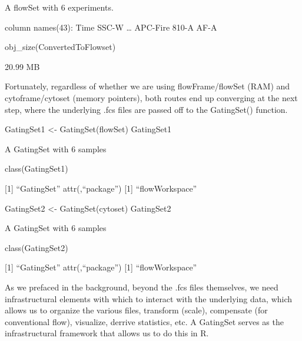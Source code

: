 \documentclass[
  letterpaper,
  DIV=11,
  numbers=noendperiod]{scrartcl}
\newenvironment{Shaded}{\begin{snugshade}}{\end{snugshade}}
\newcommand{\FunctionTok}[1]{\textcolor[rgb]{0.28,0.35,0.67}{#1}}
\newcommand{\NormalTok}[1]{\textcolor[rgb]{0.00,0.23,0.31}{#1}}
\newcommand{\OtherTok}[1]{\textcolor[rgb]{0.00,0.23,0.31}{#1}}
\begin{document}
A flowSet with 6 experiments.

column names(43): Time SSC-W \ldots{} APC-Fire 810-A AF-A

\begin{Shaded}
\begin{Highlighting}[]
\FunctionTok{obj\_size}\NormalTok{(ConvertedToFlowset)}
\end{Highlighting}
\end{Shaded}

20.99 MB

Fortunately, regardless of whether we are using flowFrame/flowSet (RAM)
and cytoframe/cytoset (memory pointers), both routes end up converging
at the next step, where the underlying .fcs files are passed off to the
GatingSet() function.

\begin{Shaded}
\begin{Highlighting}[]
\NormalTok{GatingSet1 }\OtherTok{\textless{}{-}} \FunctionTok{GatingSet}\NormalTok{(flowSet)}
\NormalTok{GatingSet1 }
\end{Highlighting}
\end{Shaded}

A GatingSet with 6 samples

\begin{Shaded}
\begin{Highlighting}[]
\FunctionTok{class}\NormalTok{(GatingSet1)}
\end{Highlighting}
\end{Shaded}

{[}1{]} ``GatingSet'' attr(,``package'') {[}1{]} ``flowWorkspace''

\begin{Shaded}
\begin{Highlighting}[]
\NormalTok{GatingSet2 }\OtherTok{\textless{}{-}} \FunctionTok{GatingSet}\NormalTok{(cytoset)}
\NormalTok{GatingSet2}
\end{Highlighting}
\end{Shaded}

A GatingSet with 6 samples

\begin{Shaded}
\begin{Highlighting}[]
\FunctionTok{class}\NormalTok{(GatingSet2)}
\end{Highlighting}
\end{Shaded}

{[}1{]} ``GatingSet'' attr(,``package'') {[}1{]} ``flowWorkspace''

As we prefaced in the background, beyond the .fcs files themselves, we
need infrastructural elements with which to interact with the underlying
data, which allows us to organize the various files, transform (scale),
compensate (for conventional flow), visualize, derrive statistics, etc.
A GatingSet serves as the infrastructural framework that allows us to do
this in R.
\end{document}
